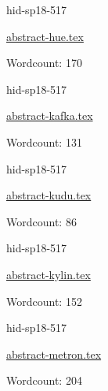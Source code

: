 

\begin{IU}

hid-sp18-517

\href{https://github.com/cloudmesh-community/hid-sp18-517/blob/master//technology/abstract-hue.tex}{abstract-hue.tex}

 

Wordcount: 170

\end{IU}



\begin{IU}

hid-sp18-517

\href{https://github.com/cloudmesh-community/hid-sp18-517/blob/master//technology/abstract-kafka.tex}{abstract-kafka.tex}

 

Wordcount: 131

\end{IU}



\begin{IU}

hid-sp18-517

\href{https://github.com/cloudmesh-community/hid-sp18-517/blob/master//technology/abstract-kudu.tex}{abstract-kudu.tex}

 

Wordcount: 86

\end{IU}



\begin{IU}

hid-sp18-517

\href{https://github.com/cloudmesh-community/hid-sp18-517/blob/master//technology/abstract-kylin.tex}{abstract-kylin.tex}

 

Wordcount: 152

\end{IU}



\begin{IU}

hid-sp18-517

\href{https://github.com/cloudmesh-community/hid-sp18-517/blob/master//technology/abstract-metron.tex}{abstract-metron.tex}

 

Wordcount: 204

\end{IU}

